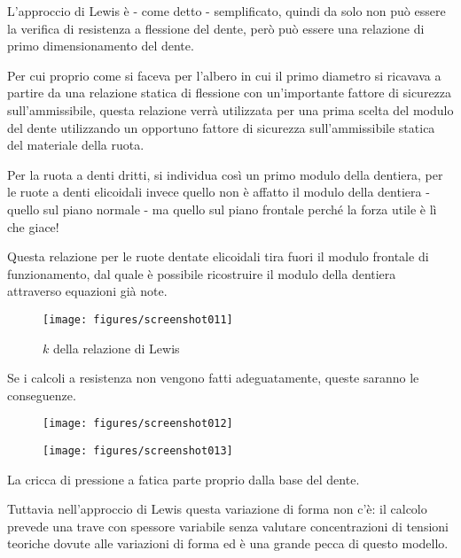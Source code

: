 \documentclass[a4paper, 15pt]{article}
\begin{document}
\begin{adjustwidth}{2in}{}
L'approccio di Lewis è - come detto - semplificato, quindi da solo non può essere la verifica di resistenza a flessione del dente, però può essere una relazione di primo dimensionamento del dente. 

Per cui proprio come si faceva per l'albero in cui il primo diametro si ricavava a partire da una relazione statica di flessione con un'importante fattore di sicurezza sull'ammissibile, questa relazione verrà utilizzata per una prima scelta del modulo del dente utilizzando un opportuno fattore di sicurezza sull'ammissibile statica del materiale della ruota. 

Per la ruota a denti dritti, si individua così un primo modulo della dentiera, per le ruote a denti elicoidali invece quello non è affatto il modulo della dentiera - quello sul piano normale - ma quello sul piano frontale perché la forza utile è lì che giace! 	

Questa relazione per le ruote dentate elicoidali tira fuori il modulo frontale di funzionamento, dal quale è possibile ricostruire il modulo della dentiera attraverso equazioni già note. \newline 

\begin{figure}[H]
	\centering
	\texttt{[image: figures/screenshot011]}
	\caption{$k$ della relazione di Lewis}
	\label{fig:screenshot011}
\end{figure}

Se i calcoli a resistenza non vengono fatti adeguatamente, queste saranno le conseguenze.
\begin{figure}[H]
	\parbox{0.60\textwidth}{\centering
	\texttt{[image: figures/screenshot012]}
	\label{fig:screenshot012}}
\hfill
	\parbox{0.45\textwidth}{\centering
	\texttt{[image: figures/screenshot013]}
	\label{fig:screenshot013}}
\end{figure}

La cricca di pressione a fatica parte proprio dalla base del dente. 

Tuttavia nell'approccio di Lewis questa variazione di forma non c'è: il calcolo prevede una trave con spessore variabile senza valutare concentrazioni  di tensioni teoriche dovute alle variazioni di forma ed è una grande pecca di questo modello. 
\end{adjustwidth}
\end{document}
